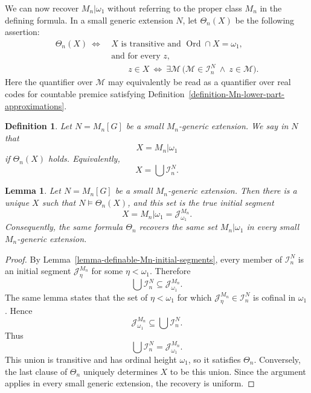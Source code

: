 \documentclass[a4paper,11pt]{article}
\newtheorem{lemma}[theorem]{Lemma}
\newtheorem{definition}[theorem]{Definition}
\begin{document}
We can now recover $M_n|\omega_1$ without referring to the proper
class $M_n$ in the defining formula.  In a small generic extension $N$, let
$\Theta_n(X)$ be the following assertion:
\begin{align*}
\Theta_n(X)\ \Longleftrightarrow\ {}&X\text{ is transitive and }
   \operatorname{Ord}\cap X=\omega_1,\\
&\text{and for every }z,\\[-2mm]
&\qquad z\in X
   \ \Longleftrightarrow\
   \exists\mathcal M\,
      \bigl(\mathcal M\in\mathcal I_n^N\ \wedge\ z\in\mathcal M\bigr).
\end{align*}
Here the quantifier over $\mathcal M$ may equivalently be read as a quantifier
over real codes for countable premice satisfying
Definition~\ref{definition-Mn-lower-part-approximations}.

\begin{definition}
\label{definition-recover-Mn-omega1}
Let $N=M_n[G]$ be a small $M_n$-generic extension.  We say in $N$ that
\[
   X=M_n|\omega_1
\]
if $\Theta_n(X)$ holds.  Equivalently,
\[
   X=\bigcup\mathcal I_n^N.
\]
\end{definition}

\begin{lemma}
\label{lemma-correctness-recovery-Mn-omega1}
Let $N=M_n[G]$ be a small $M_n$-generic extension.  Then there is a unique
$X$ such that $N\models\Theta_n(X)$, and this set is the true initial segment
\[
   X=M_n|\omega_1
    =\mathcal J^{M_n}_{\omega_1}.
\]
Consequently, the same formula $\Theta_n$ recovers the same set
$M_n|\omega_1$ in every small $M_n$-generic extension.
\end{lemma}

\begin{proof}
By Lemma~\ref{lemma-definable-Mn-initial-segments}, every member of
$\mathcal I_n^N$ is an initial segment
$\mathcal J^{M_n}_\eta$ for some $\eta<\omega_1$.  Therefore
\[
   \bigcup\mathcal I_n^N
   \subseteq\mathcal J^{M_n}_{\omega_1}.
\]
The same lemma states that the set of $\eta<\omega_1$ for which
$\mathcal J^{M_n}_\eta\in\mathcal I_n^N$ is cofinal in $\omega_1$.  Hence
\[
   \mathcal J^{M_n}_{\omega_1}
   \subseteq\bigcup\mathcal I_n^N.
\]
Thus
\[
   \bigcup\mathcal I_n^N=\mathcal J^{M_n}_{\omega_1}.
\]
This union is transitive and has ordinal height $\omega_1$, so it satisfies
$\Theta_n$.  Conversely, the last clause of $\Theta_n$ uniquely determines
$X$ to be this union.  Since the argument applies in every small generic
extension, the recovery is uniform.
\end{proof}
\end{document}
